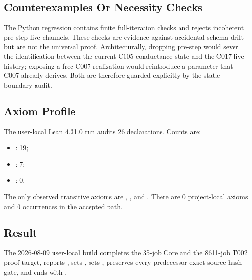 \subsection{Counterexamples Or Necessity
Checks}\label{counterexamples-or-necessity-checks-10}

The Python regression contains finite full-iteration checks and rejects
incoherent pre-step live channels. These checks are evidence against
accidental schema drift but are not the universal proof.
Architecturally, dropping pre-step \texttt{\protect{}} would
sever the identification between the current C005 conductance state and
the C017 live history; exposing a free C007 realization would
reintroduce a parameter that C007 already derives. Both are therefore
guarded explicitly by the static boundary audit.

\subsection{Axiom Profile}\label{axiom-profile-12}

The user-local Lean 4.31.0 run audits 26 declarations. Counts are:

\begin{itemize}
\tightlist
\item
  \texttt{\protect{}}: 19;
\item
  \texttt{\protect{}}: 7;
\item
  \texttt{\protect{}}: 0.
\end{itemize}

The only observed transitive axioms are \texttt{\protect{}},
\texttt{\protect{}}, and \texttt{\protect{}}. There are 0
project-local axioms and 0 \texttt{\protect{}} occurrences in the accepted
path.

\subsection{Result}\label{result-30}

The 2026-08-09 user-local build completes the 35-job Core and the
8611-job T002 proof target, reports
\texttt{\protect{}}, sets
\texttt{\protect{}}, sets
\texttt{\protect{}}, preserves every
predecessor exact-source hash gate, and ends with
\texttt{\protect{}}.


